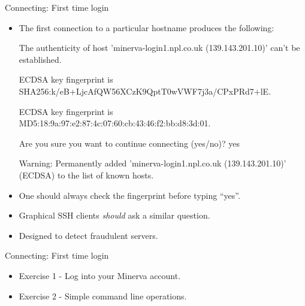 \begin{frame}{Connecting: First time login}
\begin{itemize}
\item{The first connection to a particular hostname produces the following:}
\begin{semiverbatim}\tiny
The authenticity of host 'minerva-login1.npl.co.uk (139.143.201.10)' can't be established.


ECDSA key fingerprint is {SHA256:k/eB+LjcAfQW56XCzK9QptT0wVWF7j3a/CPxPRd7+lE}.

ECDSA key fingerprint is {MD5:18:9a:97:e2:87:4c:07:60:cb:43:46:f2:bb:d8:3d:01}.


Are you sure you want to continue connecting (yes/no)? {yes}

Warning: Permanently added 'minerva-login1.npl.co.uk (139.143.201.10)' (ECDSA) to the list of known hosts.
\end{semiverbatim}
\smallskip\item{\alert{One should always check the fingerprint before typing ``yes''.}}
\item{Graphical SSH clients \emph{should} ask a similar question.}
\item{Designed to detect fraudulent servers.}
\end{itemize}
\end{frame}

\begin{frame}[fragile]{Connecting: First time login}
\begin{itemize}
\item{Exercise 1 - Log into your Minerva account.}
  \pause
  \item{Exercise 2 - Simple command line operations.}
\end{itemize}
\end{frame}


